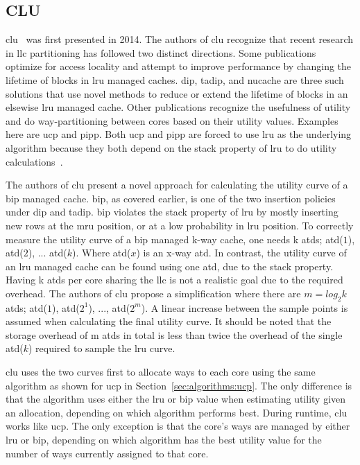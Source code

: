 
\subsection{CLU}
\label{sec:algorithms:clu}

\gls{clu}~\cite{Zhan2014} was first presented in 2014.
The authors of \gls{clu} recognize that recent research in \gls{llc} partitioning has followed two distinct directions.
Some publications optimize for access locality and attempt to improve performance by changing the lifetime of blocks in \gls{lru} managed caches.
\gls{dip}, \gls{tadip}, and \gls{nucache} are three such solutions that use novel methods to reduce or extend the lifetime of blocks in an elsewise \gls{lru} managed cache.
Other publications recognize the usefulness of utility and do way-partitioning between cores based on their utility values.
Examples here are \gls{ucp} and \gls{pipp}.
Both \gls{ucp} and \gls{pipp} are forced to use \gls{lru} as the underlying algorithm because they both depend on the stack property of \gls{lru} to do utility calculations~\cite{Qureshi2006, Xie2009}.

The authors of \gls{clu} present a novel approach for calculating the utility curve of a \gls{bip} managed cache.
\gls{bip}, as covered earlier, is one of the two insertion policies under \gls{dip} and \gls{tadip}. 
\gls{bip} violates the stack property of \gls{lru} by mostly inserting new rows at the \gls{mru} position, or at a low probability in \gls{lru} position.
To correctly measure the utility curve of a \gls{bip} managed k-way cache, one needs k \glspl{atd}; \gls{atd}($1$), \gls{atd}($2$), ... \gls{atd}($k$). 
Where \gls{atd}($x$) is an x-way \gls{atd}.
In contrast, the utility curve of an \gls{lru} managed cache can be found using one \gls{atd}, due to the stack property.
Having k \glspl{atd} per core sharing the \gls{llc} is not a realistic goal due to the required overhead.
The authors of \gls{clu} propose a simplification where there are $m = log_2 k$ \glspl{atd}; \gls{atd}($1$), \gls{atd}($2^1$), ..., \gls{atd}($2^m$).
A linear increase between the sample points is assumed when calculating the final utility curve.
It should be noted that the storage overhead of m \glspl{atd} in total is less than twice the overhead of the single \gls{atd}($k$) required to sample the \gls{lru} curve.

\gls{clu} uses the two curves first to allocate ways to each core using the same algorithm as shown for \gls{ucp} in Section~\ref{sec:algorithms:ucp}.
The only difference is that the algorithm uses either the \gls{lru} or \gls{bip} value when estimating utility given an allocation, depending on which algorithm performs best.
During runtime, \gls{clu} works like \gls{ucp}.
The only exception is that the core's ways are managed by either \gls{lru} or \gls{bip}, depending on which algorithm has the best utility value for the number of ways currently assigned to that core.

